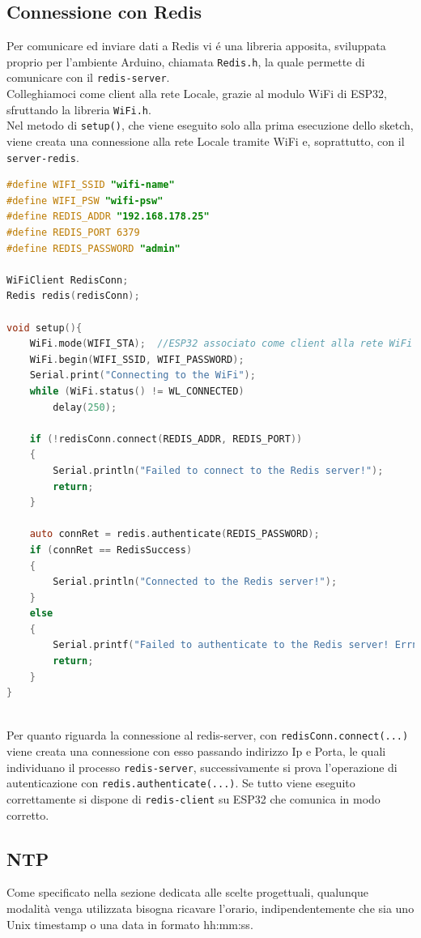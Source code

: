 \subsection{Connessione con Redis}
Per comunicare ed inviare dati a Redis vi é una libreria apposita, sviluppata proprio per l'ambiente Arduino, chiamata \texttt{Redis.h},
la quale permette di comunicare con il \texttt{redis-server}.\\
Colleghiamoci come client alla rete Locale, grazie al modulo WiFi di ESP32, sfruttando la libreria \texttt{WiFi.h}.\\
Nel metodo di \texttt{setup()}, che viene eseguito solo alla prima esecuzione dello sketch, viene creata una connessione alla rete Locale tramite WiFi e, soprattutto, con il \texttt{server-redis}.
\begin{lstlisting}[autogobble, style=c, language=C]
#define WIFI_SSID "wifi-name"
#define WIFI_PSW "wifi-psw"
#define REDIS_ADDR "192.168.178.25"
#define REDIS_PORT 6379
#define REDIS_PASSWORD "admin"

WiFiClient RedisConn;
Redis redis(redisConn);

void setup(){
    WiFi.mode(WIFI_STA);  //ESP32 associato come client alla rete WiFi
    WiFi.begin(WIFI_SSID, WIFI_PASSWORD);
    Serial.print("Connecting to the WiFi");
    while (WiFi.status() != WL_CONNECTED)
        delay(250);

    if (!redisConn.connect(REDIS_ADDR, REDIS_PORT))
    {
        Serial.println("Failed to connect to the Redis server!");
        return;
    }

    auto connRet = redis.authenticate(REDIS_PASSWORD);
    if (connRet == RedisSuccess)
    {
        Serial.println("Connected to the Redis server!");
    }
    else
    {
        Serial.printf("Failed to authenticate to the Redis server! Errno: %d\n", connRet);
        return;
    }
}
\end{lstlisting}
\\
Per quanto riguarda la connessione al redis-server,  con \texttt{redisConn.connect(...)} viene creata una connessione con esso
passando indirizzo Ip e Porta, le quali individuano il processo \texttt{redis-server}, successivamente si prova l'operazione di autenticazione con
\texttt{redis.authenticate(...)}.
Se tutto viene eseguito correttamente si dispone di \texttt{redis-client} su ESP32 che comunica in modo corretto.


\subsection{NTP}
Come specificato nella sezione dedicata alle scelte progettuali, qualunque modalità venga utilizzata bisogna ricavare l'orario,
indipendentemente che sia uno Unix timestamp o una data in formato hh:mm:ss.
